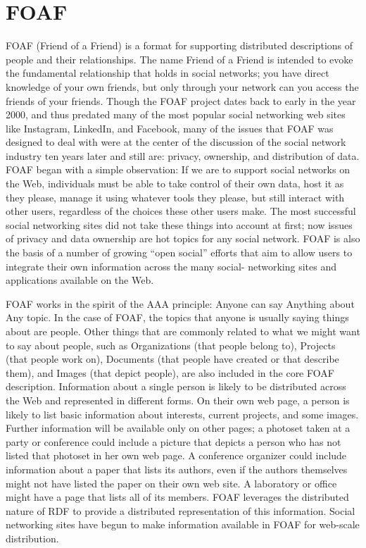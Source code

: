 \section{FOAF}
\label{foaf}
FOAF (Friend of a Friend) is a format for supporting distributed
descriptions of people and their relationships. The name Friend of a
Friend is intended to evoke the fundamental relationship that holds in
social networks; you have direct knowledge of your own friends, but only
through your network can you access the friends of your friends. Though
the FOAF project dates back to early in the year 2000, and thus predated
many of the most popular social networking web sites like Instagram,
LinkedIn, and Facebook, many of the issues that FOAF was designed to
deal with were at the center of the discussion of the social network
industry ten years later and still are: privacy, ownership, and
distribution of data. FOAF began with a simple observation: If we are to
support social networks on the Web, individuals must be able to take
control of their own data, host it as they please, manage it using
whatever tools they please, but still interact with other users,
regardless of the choices these other users make. The most successful
social networking sites did not take these things into account at first;
now issues of privacy and data ownership are hot topics for any social
network. FOAF is also the basis of a number of growing ``open social''
efforts that aim to allow users to integrate their own information
across the many social- networking sites and applications available on
the Web.

FOAF works in the spirit of the AAA principle: Anyone can say Anything
about Any topic. In the case of FOAF, the topics that anyone is usually
saying things about are people. Other things that are commonly related
to what we might want to say about people, such as Organizations (that
people belong to), Projects (that people work on), Documents (that
people have created or that describe them), and Images (that depict
people), are also included in the core FOAF description. Information
about a single person is likely to be distributed across the Web and
represented in different forms. On their own web page, a person is
likely to list basic information about interests, current projects, and
some images. Further information will be available only on other pages;
a photoset taken at a party or conference could include a picture that
depicts a person who has not listed that photoset in her own web page. A
conference organizer could include information about a paper that lists
its authors, even if the authors themselves might not have listed the
paper on their own web site. A laboratory or office might have a page
that lists all of its members. FOAF leverages the distributed nature of
RDF to provide a distributed representation of this information. Social
networking sites have begun to make information available in FOAF for
web-scale distribution.


